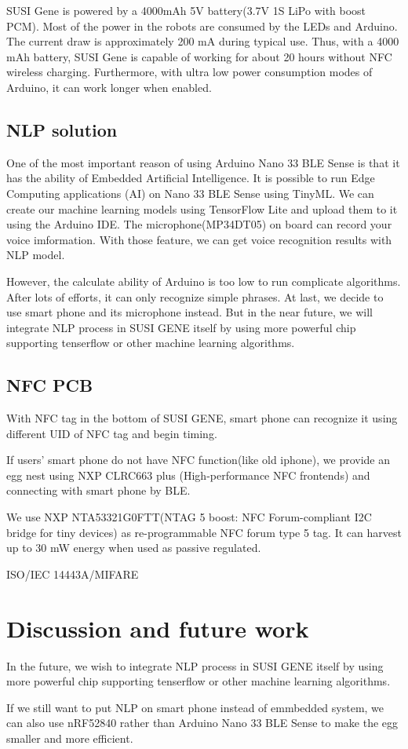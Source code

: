 \documentclass[manuscript,screen]{acmart}
\begin{document}
SUSI Gene is powered by a 4000mAh 5V battery(3.7V 1S LiPo with boost PCM). Most of the power in the robots are consumed by the LEDs and Arduino. The current draw is approximately 200 mA during typical use. Thus, with a 4000 mAh battery, SUSI Gene is capable of working for about 20 hours without NFC wireless charging. Furthermore, with ultra low power consumption modes of Arduino, it can work longer when enabled.

\subsection{NLP solution}

One of the most important reason of using Arduino Nano 33 BLE Sense is that it has the ability of Embedded Artificial Intelligence. It is possible to run Edge Computing applications (AI) on Nano 33 BLE Sense using TinyML. We can create our machine learning models using TensorFlow Lite and upload them to it using the Arduino IDE. The microphone(MP34DT05) on board can record your voice imformation. With those feature, we can get voice recognition results with NLP model.

However, the calculate ability of Arduino is too low to run complicate algorithms. After lots of efforts, it can only recognize simple phrases. At last, we decide to use smart phone and its microphone instead. But in the near future, we will integrate NLP process in SUSI GENE itself by using more powerful chip supporting tenserflow or other machine learning algorithms. 

\subsection{NFC PCB}

With NFC tag in the bottom of SUSI GENE, smart phone can recognize it using different UID of NFC tag and begin timing.

If users' smart phone do not have NFC function(like old iphone), we provide an egg nest using NXP CLRC663 plus (High-performance NFC frontends) and connecting with smart phone by BLE.

We use NXP NTA53321G0FTT(NTAG 5 boost: NFC Forum-compliant I2C bridge for tiny devices) as re-programmable NFC forum type 5 tag. It can harvest up to 30 mW energy when used as passive regulated.

ISO/IEC 14443A/MIFARE

\section{Discussion and future work}

In the future, we wish to integrate NLP process in SUSI GENE itself by using more powerful chip supporting tenserflow or other machine learning algorithms. 

If we still want to put NLP on smart phone instead of emmbedded system, we can also use nRF52840 rather than Arduino Nano 33 BLE Sense to make the egg smaller and more efficient.




\end{document}
